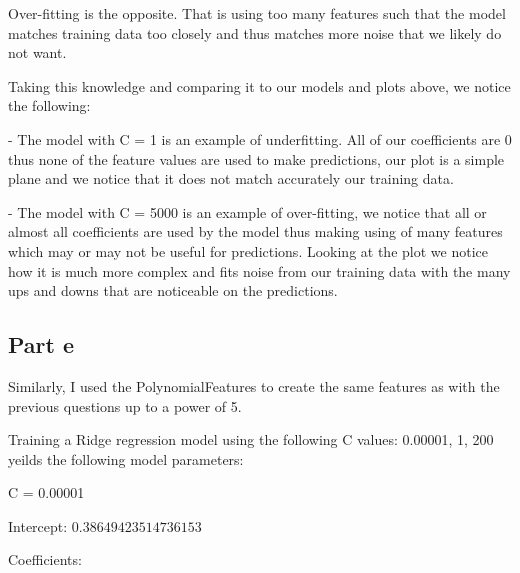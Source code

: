 \documentclass[10pt]{article}
\begin{document}
Over-fitting is the opposite. That is using too many features such that the model
matches training data too closely and thus matches more noise that we likely do not want.

Taking this knowledge and comparing it to our models and plots above, we notice the following:

- The model with C = 1 is an example of underfitting. All of our coefficients are 0 thus
none of the feature values are used to make predictions, our plot is a simple plane 
and we notice that it does not match accurately our training data.

- The model with C = 5000 is an example of over-fitting, we notice that all or almost all 
coefficients are used by the model thus making using of many features which may 
or may not be useful for predictions. Looking at the plot we notice how it is much more complex
and fits noise from our training data with the many ups and downs that are noticeable on the predictions.


\subsection*{Part e}
Similarly, I used the PolynomialFeatures to create the same features as with the previous questions up
to a power of 5.

Training a Ridge regression model using the following C values: 0.00001, 1, 200 yeilds the following
model parameters:

\vspace{5mm} %

C = 0.00001
\par
Intercept: $0.38649423514736153$
\par
Coefficients:
\begin{equation*}
    [ 0.00000000e+00, 1.51458548e-04, 1.47029680e-03, 3.40428762e-04
\end{equation*}
\begin{equation*}
    -4.46143189e-05, -9.72722585e-06, 6.50007693e-05, 5.18327561e-04
\end{equation*}
\begin{equation*}
    1.43993794e-04, 9.12639486e-04, 3.19489175e-04, -2.50299601e-05
\end{equation*}
\begin{equation*}
    9.40108739e-05, -2.14996644e-05, -1.26054105e-05, 3.83327579e-05
\end{equation*}
\begin{equation*}
    3.23922402e-04, 6.38460692e-05, 3.09930239e-04, 1.35033294e-04
\end{equation*}
\begin{equation*}
    6.60283127e-04]
\end{equation*}
\end{document}
